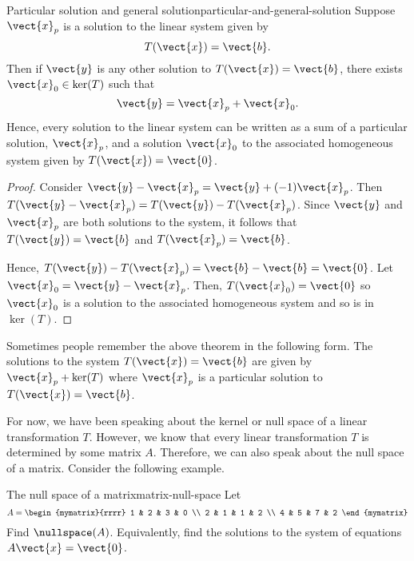 \begin{theorem}{Particular solution and general solution}{particular-and-general-solution}
Suppose $\vect{x}_{p}$ is a solution to the linear system given by
\begin{equation*}
T(\vect{x}) = \vect{b}.
\end{equation*}
Then if $\vect{y}$ is any other solution to $T(\vect{x})=\vect{b}$,
 there exists $\vect{x}_0 \in \ker
(T) $ such that
\begin{equation*}
\vect{y} = \vect{x}_{p}+ \vect{x}_0.
\end{equation*}
Hence, every solution to the linear system can be written as a sum of a particular solution, $\vect{x}_p$,
 and a solution $\vect{x}_0$ to the associated
homogeneous system given by $T(\vect{x})=\vect{0}$.
\end{theorem}

\begin{proof}
Consider $\vect{y} - \vect{x}_{p}= \vect{y} + (
-1) \vect{x}_{p}$. Then $T(\vect{y} - \vect{x}_{p}) =T(\vect{y})
-T(\vect{x}_{p})$. Since $\vect{y}$ and $\vect{x}_{p}$ are both solutions to the system, it follows that $T(\vect{y})= \vect{b} $
and $T(\vect{x}_p) = \vect{b}$.

Hence, $T(\vect{y})-T(\vect{x}_{p})
=\vect{b} - \vect{b} = \vect{0}$.  Let $\vect{x}_0 = \vect{y} - \vect{x}_{p}$.
Then, $T(\vect{x}_0)= \vect{0} $ so $\vect{x}_0$ is a solution to the associated homogeneous system and so is in $\ker (T)$.
\end{proof}

Sometimes people remember the above theorem in the following form. The
solutions to the system $T(\vect{x})=\vect{b}$ are given by
$\vect{x}_{p}+\ker (T) $ where $\vect{x}_{p}$ is a particular
solution to $T(\vect{x})=\vect{b}$.

For now, we have been speaking about the kernel or null space of a linear transformation $T$. However,
we know that every linear transformation $T$ is determined by some matrix $A$. Therefore,
we can also speak about the null space of a matrix. Consider the following example.

\begin{example}{The null space of a matrix}{matrix-null-space}
Let
\begin{equation*}
A=\begin{mymatrix}{rrrr}
1 & 2 & 3 & 0 \\
2 & 1 & 1 & 2 \\
4 & 5 & 7 & 2
\end{mymatrix}
\end{equation*}
Find $\nullspace(A)$. Equivalently, find the solutions to the
system of equations $A\vect{x}=\vect{0}$.
\end{example}

